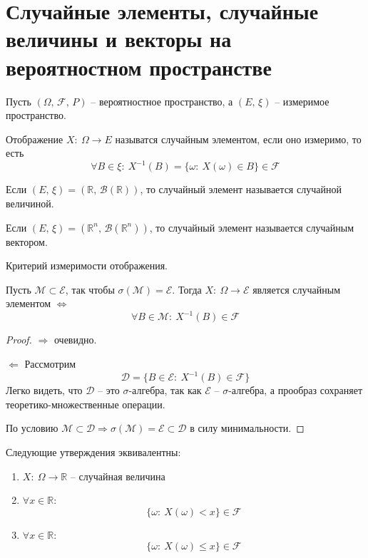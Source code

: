 \section{Случайные элементы, случайные величины и векторы на вероятностном пространстве}
Пусть $(\Omega,\, \mathcal{F},\, P)$ -- вероятностное пространство, а $(E,\, \xi)$ -- измеримое пространство.

\begin{definition}
	Отображение $X:\: \Omega \to E$ называтся случайным элементом, если оно измеримо, то есть
	\[\forall B \in \xi:\: X^{-1}(B) = \{\omega :\: X(\omega) \in B\} \in \mathcal{F}\]
\end{definition}

\begin{definition}
	Если $(E,\, \xi) = (\mathbb{R},\, \mathcal{B}(\mathbb{R}))$, то случайный элемент называется случайной величиной.
\end{definition}

\begin{definition}
	Если $(E,\,\xi) = (\mathbb{R}^n,\, \mathcal{B}(\mathbb{R}^n))$, то случайный элемент называется случайным вектором.
\end{definition}

\begin{lemma}
	Критерий измеримости отображения.

	Пусть $\mathcal{M} \subset \mathcal{E}$, так чтобы $\sigma(\mathcal{M}) = \mathcal{E}$.
	Тогда $X:\: \Omega \to \mathcal{E}$ является случайным элементом $\Leftrightarrow$
	\[\forall B \in \mathcal{M}:\: X^{-1}(B) \in \mathcal{F}\]
\end{lemma}

\begin{proof}
	$\Rightarrow$ очевидно.

	$\Leftarrow$ Рассмотрим
	\[\mathcal{D} = \{B \in \mathcal{E}:\: X^{-1}(B) \in \mathcal{F}\}\]
	Легко видеть, что $\mathcal{D}$ -- это $\sigma$-алгебра, так как $\mathcal{E}$ -- $\sigma$-алгебра, а прообраз сохраняет теоретико-множественные операции.

	По условию $\mathcal{M} \subset \mathcal{D} \Rightarrow \sigma(\mathcal{M}) = \mathcal{E} \subset \mathcal{D}$ в силу минимальности.
\end{proof}

\begin{corollary}
	Следующие утверждения эквивалентны:
	\begin{enumerate}
		\item $X:\: \Omega \to \mathbb{R}$ -- случайная величина
		\item $\forall x \in \mathbb{R}$:
		      \[\{\omega:\: X(\omega) < x\} \in \mathcal{F}\]
		\item $\forall x \in \mathbb{R}$:
		      \[\{\omega:\: X(\omega) \leq x\} \in \mathcal{F}\]
	\end{enumerate}
\end{corollary}

